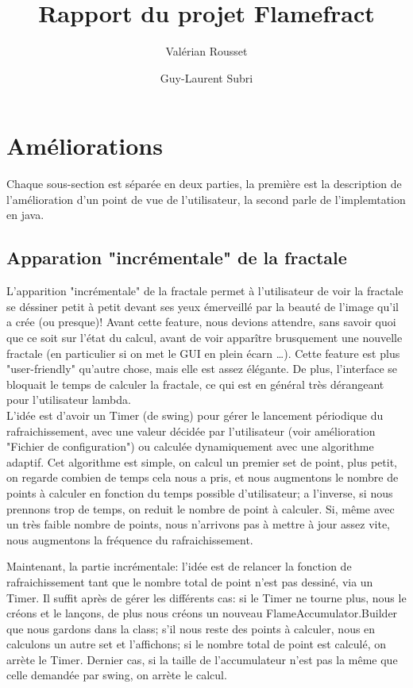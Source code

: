 \documentclass[a4paper]{article}
\author{Valérian Rousset \and Guy-Laurent Subri}
\title{Rapport du projet Flamefract}
\begin{document}
\maketitle

\section*{Améliorations}
Chaque sous-section est séparée en deux parties, la première est la description de l'amélioration d'un point de vue de l'utilisateur, la second parle de l'implemtation en java.

\subsection*{Apparation "incrémentale" de la fractale}
L'apparition "incrémentale" de la fractale permet à l'utilisateur de voir la fractale se déssiner petit à petit devant ses yeux émerveillé par la beauté de l'image qu'il a crée (ou presque)! Avant cette feature, nous devions attendre, sans savoir quoi que ce soit sur l'état du calcul, avant de voir apparître brusquement une nouvelle fractale (en particulier si on met le GUI en plein écarn \ldots). Cette feature est plus "user-friendly" qu'autre chose, mais elle est assez élégante. De plus, l'interface se bloquait le temps de calculer la fractale, ce qui est en général très dérangeant pour l'utilisateur lambda.
\\
L'idée est d'avoir un Timer (de swing) pour gérer le lancement périodique du rafraichissement, avec une valeur décidée par l'utilisateur (voir amélioration "Fichier de configuration") ou calculée dynamiquement avec une algorithme adaptif. Cet algorithme est simple, on calcul un premier set de point, plus petit, on regarde combien de temps cela nous a pris, et nous augmentons le nombre de points à calculer en fonction du temps possible d'utilisateur; a l'inverse, si nous prennons trop de temps, on reduit le nombre de point à calculer. Si, même avec un très faible nombre de points, nous n'arrivons pas à mettre à jour assez vite, nous augmentons la fréquence du rafraichissement.

Maintenant, la partie incrémentale: l'idée est de relancer la fonction de rafraichissement tant que le nombre total de point n'est pas dessiné, via un Timer. Il suffit après de gérer les différents cas: si le Timer ne tourne plus, nous le créons et le lançons, de plus nous créons un nouveau FlameAccumulator.Builder que nous gardons dans la class; s'il nous reste des points à calculer, nous en calculons un autre set et l'affichons; si le nombre total de point est calculé, on arrète le Timer. Dernier cas, si la taille de l'accumulateur n'est pas la même que celle demandée par swing, on arrète le calcul.
\end{document}

